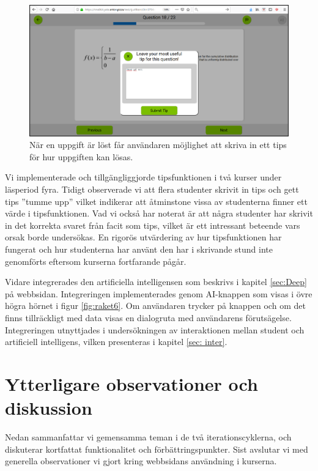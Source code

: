 \begin{figure}[hbtp]
    \centering
    \includegraphics[width=1.0\textwidth]{images/resultpictures/tipsfunktion7.png}
    \caption{När en uppgift är löst får användaren möjlighet att skriva in ett tips för hur uppgiften kan lösas.}
    \label{fig:raket7}
\end{figure}


Vi implementerade och tillgängliggjorde tipsfunktionen i två kurser under läsperiod fyra. Tidigt observerade vi att flera studenter skrivit in tips och gett tips ”tumme upp” vilket indikerar att åtminstone vissa av studenterna finner ett värde i tipsfunktionen. Vad vi också har noterat är att några studenter har skrivit in det korrekta svaret från facit som tips, vilket är ett intressant beteende vars orsak borde undersökas. En rigorös utvärdering av hur tipsfunktionen har fungerat och hur studenterna har använt den har i skrivande stund inte genomförts eftersom kurserna fortfarande pågår.

Vidare integrerades den artificiella intelligensen som beskrivs i kapitel \ref{sec:Deep} på webbsidan. Integreringen implementerades genom AI-knappen som visas i övre högra hörnet i figur \ref{fig:raket6}. Om användaren trycker på knappen och om det finns tillräckligt med data visas en dialogruta med användarens förutsägelse. Integreringen utnyttjades i undersökningen av interaktionen mellan student och artificiell intelligens, vilken presenteras i kapitel \ref{sec: inter}.

\section{Ytterligare observationer och diskussion}
\label{sec: webb-D}

Nedan sammanfattar vi gemensamma teman i de två iterationscyklerna, och diskuterar kortfattat funktionalitet och förbättringspunkter. Sist avslutar vi med generella observationer vi gjort kring webbsidans användning i kurserna. 

